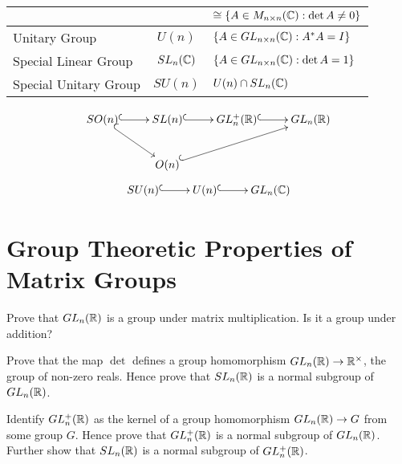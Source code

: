 \begin{center}
\begin{tabular}{|l|c|l|}
		                                &                             & $\cong \{ A \in M_{n \times n}(\mathbb{C}) : \det A \neq 0\}$              \\\hline
		Unitary Group                   & $U(n)$                      & $\{ A \in GL_{n \times n}(\mathbb{C}) : A^*A = I\}$                        \\\hline   Special Linear Group & $SL_n(\mathbb{C})$ & $\{ A \in GL_{n \times n}(\mathbb{C}) : \det A =1\}$ \\\hline
		Special Unitary Group           & $SU(n)$                     & $U(n) \cap SL_n(\mathbb{C})$                                               \\\hline
	\end{tabular}
\end{center}

\begin{align*}
                                   \xymatrix{
  SO(n) \ar@{^{(}->}[r] \ar@{^{(}->}[dr] & SL(n) \ar@{^{(}->}[r]  & GL_n^+(\R) \ar@{^{(}->}[r] & GL_n(\R) \\
	                                       & O(n) \ar@{^{(}->}[urr]
	}
\end{align*}
\begin{align*}
                                   \xymatrix{
  	SU(n) \ar@{^{(}->}[r]                  & U(n) \ar@{^{(}->}[r]   & GL_n(\C)
  	}
\end{align*}





\newpage
\section{Group Theoretic Properties of Matrix Groups}
\begin{question}
	Prove that $GL_n(\mathbb{R})$ is a group under matrix multiplication. Is it a group under addition?
\end{question}

\begin{question}
	Prove that the map $\det$ defines a group homomorphism $GL_n(\mathbb{R}) \rightarrow \mathbb{R}^\times$, the group of non-zero reals. Hence prove that $SL_n(\mathbb{R})$ is a normal subgroup of $GL_n(\mathbb{R})$.
\end{question}

\begin{question}
	Identify $GL^+_n(\mathbb{R})$ as the kernel of a group homomorphism $GL_n(\mathbb{R}) \rightarrow G$ from some group $G$. Hence prove that $GL^+_n(\mathbb{R})$ is a normal subgroup of $GL_n(\mathbb{R})$. Further show that $SL_n(\mathbb{R})$ is a normal subgroup of $GL^+_n(\mathbb{R})$.
\end{question}

